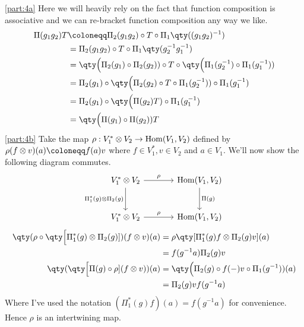\documentclass[
	pages,
	boxes,
	color=WildStrawberry
]{homework}
\begin{document}
\begin{solution}
	\ref{part:4a}
	Here we will heavily rely on the fact that function composition is associative and we can re-bracket function composition any way we like.
	\begin{align*}
		\Pi(g_1g_2)T & \defeq \Pi_2(g_1g_2)\circ T \circ \Pi_1\qty((g_1g_2)^{-1})                                         \\
		             & = \Pi_2(g_1g_2)\circ T \circ \Pi_1\qty(g_2^{-1}g_1^{-1})                                           \\
		             & = \qty\Big(\Pi_2(g_1)\circ \Pi_2(g_2))\circ T \circ \qty\Big(\Pi_1(g_2^{-1})\circ \Pi_1(g_1^{-1})) \\
		             & = \Pi_2(g_1)\circ \qty\Big(\Pi_2(g_2)\circ T \circ \Pi_1(g_2^{-1})) \circ \Pi_1(g_1^{-1})          \\
		             & = \Pi_2(g_1)\circ \qty\Big(\Pi(g_2)T) \circ \Pi_1(g_1^{-1})                                        \\
		             & = \qty\Big(\Pi(g_1) \circ \Pi(g_2))T
	\end{align*}
	\ref{part:4b}
	Take the map $\rho: V_1^*\otimes V_2 \to \operatorname{Hom}(V_1, V_2)$ defined by $\rho(f\otimes v)(a) \defeq f(a)v$ where $f\in V_1^*, v\in V_2$ and $a\in V_1$. We'll now show the following diagram commutes.
	\begin{equation*}
		\begin{tikzcd}[row sep=large, column sep=large]
			V_1^*\otimes V_2 \arrow{r}{\rho} \arrow[swap]{d}{\Pi_1^*(g)\otimes \Pi_2(g)} & \Hom(V_1, V_2) \arrow{d}{\Pi(g)} \\
			V_1^*\otimes V_2 \arrow{r}{\rho} & \Hom(V_1, V_2)
		\end{tikzcd}
	\end{equation*}
	\begin{align*}
		\qty(\rho\circ \qty\Big[\Pi_1^*(g)\otimes \Pi_2(g)])(f\otimes v)(a) & = \rho\qty[\Pi^{*}_1(g)f\otimes \Pi_2(g)v](a)         \\
		                                                                    & = f(g^{-1}a)\Pi_2(g)v                                 \\
		\qty(\qty\Big[\Pi(g)\circ\rho](f\otimes v))(a)                      & = \qty\Big(\Pi_2(g)\circ f(-)v\circ \Pi_1(g^{-1}))(a) \\
		                                                                    & = \Pi_2(g)v f(g^{-1}a)
	\end{align*}
	Where I've used the notation $(\Pi^{*}_1(g)f)(a) = f(g^{-1}a)$ for convenience. Hence $\rho$ is an intertwining map.


\end{solution}
\end{document}

